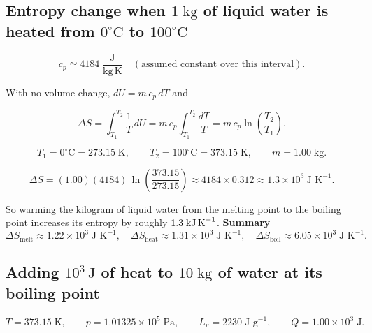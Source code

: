 \documentclass[12pt]{article}
\theoremstyle{definition} %
\theoremstyle{plain} %
\begin{document}
\subsection*{Entropy change when \(1\;\text{kg}\) of liquid water is heated
from \(0^{\circ}\text{C}\) to \(100^{\circ}\text{C}\)}

\[
  c_p \simeq 4184\;\frac{\text{J}}{\text{kg}\,\text{K}}
  \quad(\text{assumed constant over this interval}).
\]

With no volume change, \(dU = m\,c_p\,dT\) and

\[
  \Delta S
  = \int_{T_1}^{T_2} \frac{1}{T}\,dU
  = m\,c_p \int_{T_1}^{T_2} \frac{dT}{T}
  = m\,c_p \ln\!\left(\frac{T_2}{T_1}\right).
\]

\[
  T_1 = 0^{\circ}\text{C} = 273.15\;\text{K},\qquad
  T_2 = 100^{\circ}\text{C} = 373.15\;\text{K},\qquad
  m = 1.00\;\text{kg}.
\]

\[
  \Delta S
  = (1.00)(4184)\,
    \ln\!\left(\frac{373.15}{273.15}\right)
  \approx 4184 \times 0.312
  \approx \boxed{1.3 \times 10^{3}\ \text{J K}^{-1}}.
\]

So warming the kilogram of liquid water from the melting point to the
boiling point increases its entropy by roughly
\(1.3\;\text{kJ\,K}^{-1}\).
\bigskip
\noindent
\textbf{Summary}  
\[
\Delta S_{\text{melt}} \approx 1.22\times10^{3}\;\text{J K}^{-1},\quad
\Delta S_{\text{heat}} \approx 1.31\times10^{3}\;\text{J K}^{-1},\quad
\Delta S_{\text{boil}} \approx 6.05\times10^{3}\;\text{J K}^{-1}.
\]
\subsection*{Adding \(10^{3}\,\text{J}\) of heat to \(10\;\text{kg}\) of water at its boiling point}

\[
  T = 373.15\;\text{K},\qquad
  p = 1.01325\times10^{5}\;\text{Pa},\qquad
  L_v = 2230\;\text{J g}^{-1},\qquad
  Q = 1.00\times10^{3}\;\text{J}.
\]
\end{document}
